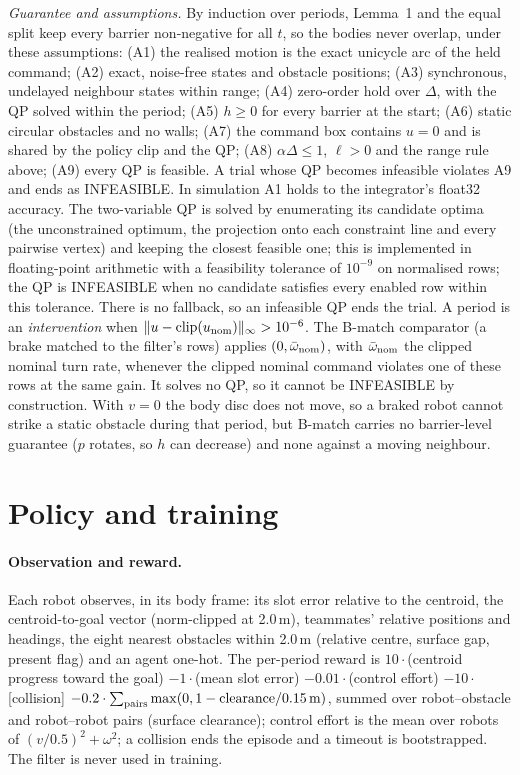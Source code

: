 \documentclass[11pt]{article}
\begin{document}
\emph{Guarantee and assumptions.} By induction over periods, Lemma~1 and the equal split keep every
barrier non-negative for all $t$, so the bodies never overlap, under these assumptions: (A1) the
realised motion is the exact unicycle arc of the held command; (A2) exact, noise-free states and obstacle
positions; (A3) synchronous, undelayed neighbour states within range; (A4) zero-order hold over $\Delta$,
with the QP solved within the period; (A5) $h\ge0$ for every barrier at the start; (A6) static circular
obstacles and no walls; (A7) the command box contains $u=0$ and is shared by the policy clip and the
QP; (A8) $\alpha\Delta\le1$, $\ell>0$ and the range rule above; (A9) every QP is feasible. A trial whose
QP becomes infeasible violates A9 and ends as INFEASIBLE. In simulation A1 holds to the integrator's
float32 accuracy. The two-variable QP is solved by enumerating its candidate optima (the unconstrained optimum, the
projection onto each constraint line and every pairwise vertex) and keeping the closest feasible one;
this is implemented in floating-point arithmetic with a feasibility tolerance of $10^{-9}$ on
normalised rows; the QP is INFEASIBLE when no candidate satisfies every enabled row within this
tolerance. There is no fallback, so an infeasible QP ends the trial. A period is an \emph{intervention}
when $\|u-\mathrm{clip}(u_{\rm nom})\|_\infty>10^{-6}$.
The B-match comparator (a brake matched to the filter's rows) applies $(0,\bar\omega_{\rm nom})$, with
$\bar\omega_{\rm nom}$ the clipped nominal turn rate, whenever the clipped nominal command violates one
of these rows at the same gain. It solves no QP, so it cannot be INFEASIBLE by construction. With $v=0$
the body disc does not move, so a braked robot cannot strike a static obstacle during that period, but
B-match carries no barrier-level guarantee ($p$ rotates, so $h$ can decrease) and none against a moving
neighbour.

\section{Policy and training}\label{sec:policy}
\paragraph{Observation and reward.} Each robot observes, in its body frame: its slot error relative
to the centroid, the centroid-to-goal vector (norm-clipped at 2.0\,m), teammates' relative positions
and headings, the eight nearest obstacles within 2.0\,m (relative centre, surface gap, present flag)
and an agent one-hot. The per-period reward is
$10\cdot$(centroid progress toward the goal) $-1\cdot$(mean slot error) $-0.01\cdot$(control effort)
$-10\cdot$[collision] $-0.2\cdot\sum_{\rm pairs}\max(0,1-\text{clearance}/0.15\,\mathrm{m})$, summed over robot--obstacle and robot--robot pairs (surface clearance); control effort is the mean over robots of $(v/0.5)^2+\omega^2$; a collision
ends the episode and a timeout is bootstrapped. The filter is never used in training.
\end{document}
